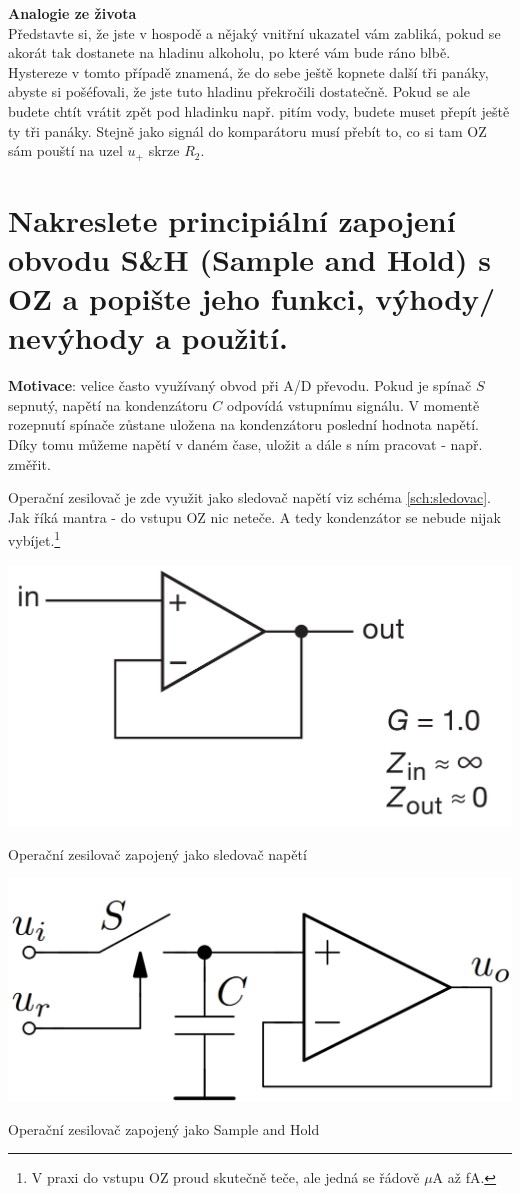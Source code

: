 \documentclass[a4paper,12pt]{article}   %
\newcommand{\tmu}{$\mu$}
\begin{document}
\textbf{Analogie ze života}\\
Představte si, že jste v hospodě a nějaký vnitřní ukazatel vám zabliká, pokud se akorát tak dostanete na hladinu alkoholu, po které vám bude ráno blbě. Hystereze v tomto případě znamená, že do sebe ještě kopnete další tři panáky, abyste si pošéfovali, že jste tuto hladinu překročili dostatečně. Pokud se ale budete chtít vrátit zpět pod hladinku např. pitím vody, budete muset přepít ještě ty tři panáky. Stejně jako signál do komparátoru musí přebít to, co si tam OZ sám pouští na uzel $u_+$ skrze $R_2$.
















\section{Nakreslete principiální zapojení obvodu S\&H (Sample and Hold) s OZ a popište jeho funkci, výhody/ nevýhody a použití.}
\textbf{Motivace}: velice často využívaný obvod při A/D převodu. Pokud je spínač $S$ sepnutý, napětí na kondenzátoru $C$ odpovídá vstupnímu signálu. V momentě rozepnutí spínače zůstane uložena na kondenzátoru poslední hodnota napětí. Díky tomu můžeme  napětí v daném čase, uložit a dále s ním pracovat - např. změřit.

Operační zesilovač je zde využit jako sledovač napětí viz schéma \ref{sch:sledovac}. Jak říká mantra - do vstupu OZ nic neteče. A tedy kondenzátor se nebude nijak vybíjet.\footnote{V praxi do vstupu OZ proud skutečně teče, ale jedná se řádově \tmu A až fA.}

\begin{schema}
    \centering
    \includegraphics[width=.5\textwidth]{voltage-follower.PNG}
    \caption{Operační zesilovač zapojený jako sledovač napětí}
    \label{sch:sledovac}
\end{schema}

\begin{schema}
    \centering
    \includegraphics[width=.5\textwidth]{sample_hold.PNG}
    \caption{Operační zesilovač zapojený jako Sample and Hold}
    \label{sch:sah}
\end{schema}
\end{document}
